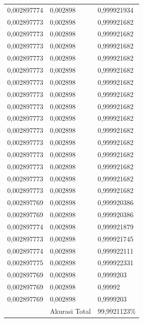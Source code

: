 \begin{center}
\begin{longtable}{|l|l|l|}
0,002897774        & 0,002898              & 0,999921934  \\
0,002897773        & 0,002898              & 0,999921682  \\
0,002897773        & 0,002898              & 0,999921682  \\
0,002897773        & 0,002898              & 0,999921682  \\
0,002897773        & 0,002898              & 0,999921682  \\
0,002897773        & 0,002898              & 0,999921682  \\
0,002897773        & 0,002898              & 0,999921682  \\
0,002897773        & 0,002898              & 0,999921682  \\
0,002897773        & 0,002898              & 0,999921682  \\
0,002897773        & 0,002898              & 0,999921682  \\
0,002897773        & 0,002898              & 0,999921682  \\
0,002897773        & 0,002898              & 0,999921682  \\
0,002897773        & 0,002898              & 0,999921682  \\
0,002897773        & 0,002898              & 0,999921682  \\
0,002897773        & 0,002898              & 0,999921682  \\
0,002897773        & 0,002898              & 0,999921682  \\
0,002897769        & 0,002898              & 0,999920386  \\
0,002897769        & 0,002898              & 0,999920386  \\
0,002897774        & 0,002898              & 0,999921879  \\
0,002897773        & 0,002898              & 0,999921745  \\
0,002897774        & 0,002898              & 0,999922111  \\
0,002897775        & 0,002898              & 0,999922331  \\
0,002897769        & 0,002898              & 0,9999203    \\
0,002897769        & 0,002898              & 0,99992      \\
0,002897769        & 0,002898              & 0,9999203    \\
                   & Akurasi Total         & 99,9921123\%     
\end{longtable}
\end{center}

